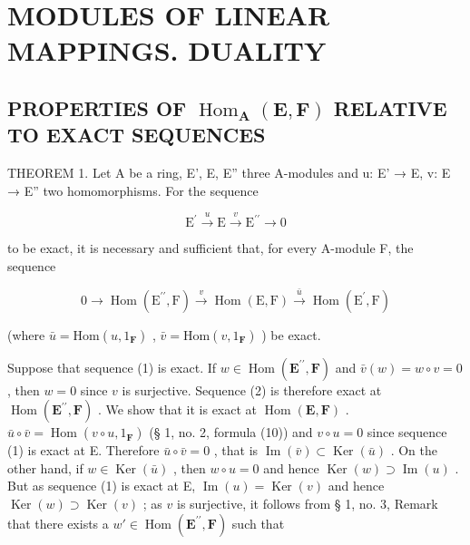 \section{MODULES OF LINEAR MAPPINGS. DUALITY}

\subsection{\texorpdfstring{PROPERTIES OF \(\operatorname{Hom}_{\mathbf{A}}(\mathbf{E}, \mathbf{F})\) RELATIVE TO EXACT SEQUENCES}{PROPERTIES OF \textbackslash operatorname\{Hom\}\_\{\textbackslash mathbf\{A\}\}(\textbackslash mathbf\{E\}, \textbackslash mathbf\{F\}) RELATIVE TO EXACT SEQUENCES}}

THEOREM 1. Let A be a ring, E', E, E'' three A-modules and u: E' → E, v: E → E'' two homomorphisms. For the sequence

\[
\mathrm{E} ^ {\prime} \stackrel {u} {\longrightarrow} \mathrm{E} \stackrel {v} {\longrightarrow} \mathrm{E} ^ {\prime \prime} \longrightarrow 0\tag{1}
\]

to be exact, it is necessary and sufficient that, for every A-module F, the sequence

\[
0 \longrightarrow \operatorname{Hom} (\mathrm{E} ^ {\prime \prime}, \mathrm{F}) \stackrel {v} {\longrightarrow} \operatorname{Hom} (\mathrm{E}, \mathrm{F}) \stackrel {\bar {u}} {\longrightarrow} \operatorname{Hom} (\mathrm{E} ^ {\prime}, \mathrm{F})\tag{2}
\]

(where \(\bar{u} = \mathrm{Hom}(u, 1_{\mathbf{F}})\) , \(\bar{v} = \mathrm{Hom}(v, 1_{\mathbf{F}})\) ) be exact.

Suppose that sequence (1) is exact. If \(w \in \operatorname{Hom}(\mathbf{E}^{\prime \prime}, \mathbf{F})\) and \(\bar{v}(w) = w \circ v = 0\) , then \(w = 0\) since \(v\) is surjective. Sequence (2) is therefore exact at \(\operatorname{Hom}(\mathbf{E}^{\prime \prime}, \mathbf{F})\) . We show that it is exact at \(\operatorname{Hom}(\mathbf{E}, \mathbf{F})\) . \(\bar{u} \circ \bar{v} = \operatorname{Hom}(v \circ u, 1_{\mathbf{F}})\) (§ 1, no. 2, formula (10)) and \(v \circ u = 0\) since sequence (1) is exact at E. Therefore \(\bar{u} \circ \bar{v} = 0\) , that is \(\operatorname{Im}(\bar{v}) \subset \operatorname{Ker}(\bar{u})\) . On the other hand, if \(w \in \operatorname{Ker}(\bar{u})\) , then \(w \circ u = 0\) and hence \(\operatorname{Ker}(w) \supset \operatorname{Im}(u)\) . But as sequence (1) is exact at E, \(\operatorname{Im}(u) = \operatorname{Ker}(v)\) and hence \(\operatorname{Ker}(w) \supset \operatorname{Ker}(v)\) ; as \(v\) is surjective, it follows from § 1, no. 3, Remark that there exists a \(w' \in \operatorname{Hom}(\mathbf{E}^{\prime \prime}, \mathbf{F})\) such that


